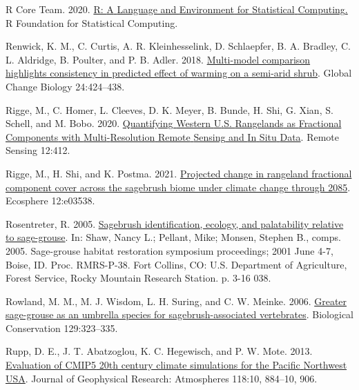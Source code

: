 \documentclass[
  12pt,
]{article}
\newlength{\cslhangindent}
\newlength{\cslentryspacingunit} %
\newenvironment{CSLReferences}[2] %
 {%
  \setlength{\parindent}{0pt}
  \ifodd #1
  \let\oldpar\par
  \def\par{\hangindent=\cslhangindent\oldpar}
  \fi
  \setlength{\parskip}{#2\cslentryspacingunit}
 }%
 {}
\begin{document}
\begin{CSLReferences}{1}{0}
\leavevmode{}%
R Core Team. 2020. \href{https://www.R-project.org/}{R: {A} {Language} and {Environment} for {Statistical} {Computing}.} R Foundation for Statistical Computing.

\leavevmode{}%
Renwick, K. M., C. Curtis, A. R. Kleinhesselink, D. Schlaepfer, B. A. Bradley, C. L. Aldridge, B. Poulter, and P. B. Adler. 2018. \href{https://doi.org/10.1111/gcb.13900}{Multi-model comparison highlights consistency in predicted effect of warming on a semi-arid shrub}. Global Change Biology 24:424--438.

\leavevmode{}%
Rigge, M., C. Homer, L. Cleeves, D. K. Meyer, B. Bunde, H. Shi, G. Xian, S. Schell, and M. Bobo. 2020. \href{https://doi.org/10.3390/rs12030412}{Quantifying {Western} {U}.{S}. {Rangelands} as {Fractional} {Components} with {Multi}-{Resolution} {Remote} {Sensing} and {In} {Situ} {Data}}. Remote Sensing 12:412.

\leavevmode{}%
Rigge, M., H. Shi, and K. Postma. 2021. \href{https://doi.org/10.1002/ecs2.3538}{Projected change in rangeland fractional component cover across the sagebrush biome under climate change through 2085}. Ecosphere 12:e03538.

\leavevmode{}%
Rosentreter, R. 2005. \href{https://www.fs.usda.gov/treesearch/pubs/21434}{Sagebrush identification, ecology, and palatability relative to sage-grouse}. In: Shaw, Nancy L.; Pellant, Mike; Monsen, Stephen B., comps. 2005. Sage-grouse habitat restoration symposium proceedings; 2001 June 4-7, Boise, ID. Proc. RMRS-P-38. Fort Collins, CO: U.S. Department of Agriculture, Forest Service, Rocky Mountain Research Station. p. 3-16 038.

\leavevmode{}%
Rowland, M. M., M. J. Wisdom, L. H. Suring, and C. W. Meinke. 2006. \href{https://doi.org/10.1016/j.biocon.2005.10.048}{Greater sage-grouse as an umbrella species for sagebrush-associated vertebrates}. Biological Conservation 129:323--335.

\leavevmode{}%
Rupp, D. E., J. T. Abatzoglou, K. C. Hegewisch, and P. W. Mote. 2013. \href{https://doi.org/10.1002/jgrd.50843}{Evaluation of {CMIP5} 20th century climate simulations for the {Pacific} {Northwest} {USA}}. Journal of Geophysical Research: Atmospheres 118:10, 884--10, 906.


\end{CSLReferences}
\end{document}
